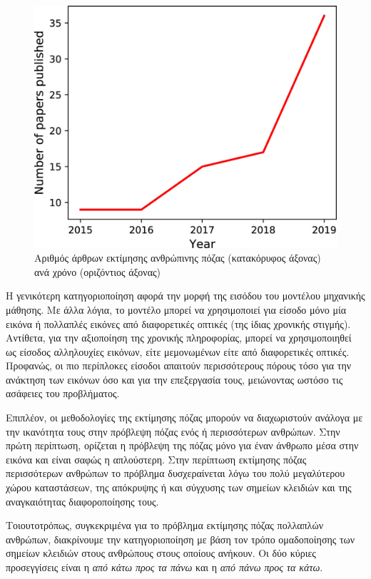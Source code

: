 \documentclass{report}
\begin{document}
\begin{figure}[h]
    \centering
    \includegraphics[scale=1.5]{images/3d_pose_estimation/pose_estimation_papers_per_year.jpg}
    \caption[Άρθρα εκτίμησης πόζας ανά χρόνο]{Αριθμός άρθρων εκτίμησης ανθρώπινης πόζας (κατακόρυφος άξονας) ανά χρόνο (οριζόντιος άξονας)}
    \label{fig:pose_estimation_papers}
\end{figure}

Η γενικότερη κατηγοριοποίηση αφορά την μορφή της εισόδου του μοντέλου μηχανικής μάθησης. Με άλλα λόγια, το μοντέλο μπορεί να χρησιμοποιεί για είσοδο μόνο μία εικόνα ή πολλαπλές εικόνες από διαφορετικές οπτικές (της ίδιας χρονικής στιγμής). Αντίθετα, για την αξιοποίηση της χρονικής πληροφορίας, μπορεί να χρησιμοποιηθεί ως είσοδος αλληλουχίες εικόνων, είτε μεμονωμένων είτε από διαφορετικές οπτικές. Προφανώς, οι πιο περίπλοκες είσοδοι απαιτούν περισσότερους πόρους τόσο για την ανάκτηση των εικόνων όσο και για την επεξεργασία τους, μειώνοντας ωστόσο τις ασάφειες του προβλήματος.

Επιπλέον, οι μεθοδολογίες της εκτίμησης πόζας μπορούν να διαχωριστούν ανάλογα με την ικανότητα τους στην πρόβλεψη πόζας ενός ή περισσότερων ανθρώπων. Στην πρώτη περίπτωση, ορίζεται η πρόβλεψη της πόζας μόνο για έναν άνθρωπο μέσα στην εικόνα και είναι σαφώς η απλούστερη. Στην περίπτωση εκτίμησης πόζας περισσότερων ανθρώπων το πρόβλημα δυσχεραίνεται λόγω του πολύ μεγαλύτερου χώρου καταστάσεων, της απόκρυψης ή και σύγχυσης των σημείων κλειδιών και της αναγκαιότητας διαφοροποίησης τους.

Τοιουτοτρόπως, συγκεκριμένα για το πρόβλημα εκτίμησης πόζας πολλαπλών ανθρώπων, διακρίνουμε την κατηγοριοποίηση με βάση τον τρόπο ομαδοποίησης των σημείων κλειδιών στους ανθρώπους στους οποίους ανήκουν. Οι δύο κύριες προσεγγίσεις είναι η \textsl{από κάτω προς τα πάνω} και η \textsl{από πάνω προς τα κάτω}.
\end{document}
